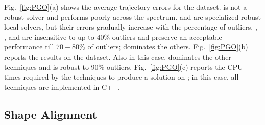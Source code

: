 Fig.~\ref{fig:PGO}(a) shows the average trajectory errors for the \intel dataset. 
\gtwoo is not a robust solver and performs poorly across the spectrum. 
\dcs and \pcm are specialized robust local solvers, 
but their errors gradually increase with the percentage 
of outliers. 
\GNCGM, \GNCTLS, and \adapt are insensitive to up to $40\%$ outliers and preserve an acceptable performance 
till $70-80\%$ of outliers; 
 \GNCTLS dominates the others. 
 Fig.~\ref{fig:PGO}(b) reports the results on the \csail dataset. Also in this case, 
 \GNCTLS dominates the other techniques and is robust to 90\% outliers. 
Fig.~\ref{fig:PGO}(c) reports the CPU times required by the techniques to produce a solution on \csail; 
in this case, all techniques are implemented in C++. 




\subsection{Shape Alignment}
\label{sec:SA} %

